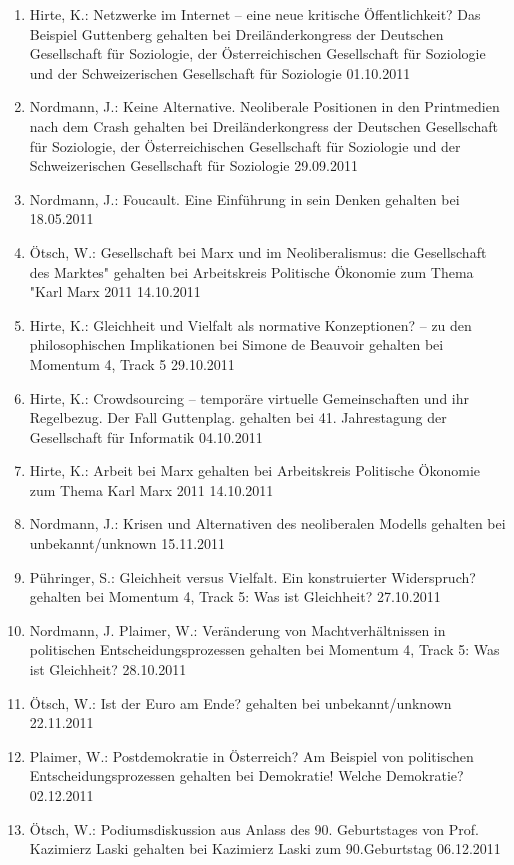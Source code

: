 \begin{enumerate}
	\item Hirte, K.: Netzwerke im Internet -- eine neue kritische Öffentlichkeit? Das Beispiel Guttenberg gehalten bei Dreiländerkongress der Deutschen Gesellschaft für Soziologie, der Österreichischen Gesellschaft für Soziologie und der Schweizerischen Gesellschaft für Soziologie 01.10.2011
	\item Nordmann, J.: Keine Alternative. Neoliberale Positionen in den Printmedien nach dem Crash gehalten bei Dreiländerkongress der Deutschen Gesellschaft für Soziologie, der Österreichischen Gesellschaft für Soziologie und der Schweizerischen Gesellschaft für Soziologie 29.09.2011
	\item Nordmann, J.: Foucault. Eine Einführung in sein Denken gehalten bei  18.05.2011
	\item Ötsch, W.: Gesellschaft bei Marx und im Neoliberalismus: die Gesellschaft \glqq des Marktes" gehalten bei Arbeitskreis Politische Ökonomie zum Thema "Karl Marx 2011\grqq{} 14.10.2011
	\item Hirte, K.: Gleichheit und Vielfalt als normative Konzeptionen? -- zu den philosophischen Implikationen bei Simone de Beauvoir gehalten bei Momentum 4, Track 5 29.10.2011
	\item Hirte, K.: Crowdsourcing -- temporäre virtuelle Gemeinschaften und ihr Regelbezug. Der Fall Guttenplag. gehalten bei 41. Jahrestagung der Gesellschaft für Informatik 04.10.2011
	\item Hirte, K.: Arbeit bei Marx gehalten bei Arbeitskreis Politische Ökonomie zum Thema \glqq Karl Marx 2011\grqq{} 14.10.2011
	\item Nordmann, J.: Krisen und Alternativen des neoliberalen Modells gehalten bei unbekannt/unknown 15.11.2011
	\item Pühringer, S.: Gleichheit versus Vielfalt. Ein konstruierter Widerspruch? gehalten bei Momentum 4, Track 5: Was ist Gleichheit? 27.10.2011
	\item Nordmann, J. Plaimer, W.: Veränderung von Machtverhältnissen in politischen Entscheidungsprozessen gehalten bei Momentum 4, Track 5: Was ist Gleichheit? 28.10.2011
	\item Ötsch, W.: Ist der Euro am Ende? gehalten bei unbekannt/unknown 22.11.2011
	\item Plaimer, W.: Postdemokratie in Österreich? Am Beispiel von politischen Entscheidungsprozessen gehalten bei Demokratie! Welche Demokratie? 02.12.2011
	\item Ötsch, W.: Podiumsdiskussion aus Anlass des 90. Geburtstages von Prof. Kazimierz Laski gehalten bei Kazimierz Laski zum 90.Geburtstag 06.12.2011

\end{enumerate}
